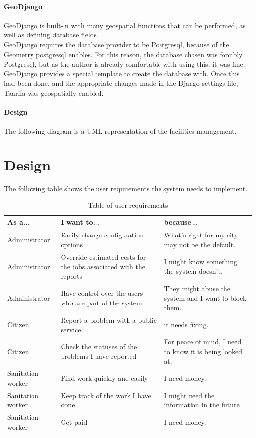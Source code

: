\subsubsection{GeoDjango}
\label{sec:geodjango}
GeoDjango is built-in with many geospatial functions that can be performed, as well as defining database fields. \\
GeoDjango requires the database provider to be Postgresql, because of the Geometry postgresql enables. For this reason, the database chosen was forcibly Postgresql, but as the author is already comfortable with using this, it was fine. \\
GeoDjango provides a special template to create the database with. Once this had been done, and the appropriate changes made in the Django settings file, Taarifa was geospatially enabled.

\subsubsection{Design}
The following diagram is a UML representation of the facilities management.


\chapter{Design}
The following table shows the user requirements the system needs to implement.

\begin{table}[h]
\centering
\begin{tabular}{p{3.8cm}|p{3.8cm}|p{3.8cm}}
\textbf{As a...} & \textbf{I want to...} & \textbf{because...} \\
\hline
Administrator & Easily change configuration options & What's right for my city may not be the default. \\
\hline
Administrator & Override estimated costs for the jobs associated with the reports & I might know something the system doesn't. \\
\hline
Administrator & Have control over the users who are part of the system & They might abuse the system and I want to block them. \\
\hline
Citizen & Report a problem with a public service & it needs fixing. \\
\hline
Citizen & Check the statuses of the problems I have reported & For peace of mind, I need to know it is being looked at. \\
\hline
Sanitation worker & Find work quickly and easily & I need money. \\
\hline
Sanitation worker & Keep track of the work I have done & I might need the information in the future \\
\hline
Sanitation worker & Get paid & I need money. \\
\end{tabular}
\caption{Table of user requirements}
\label{tab:uses}
\end{table}

